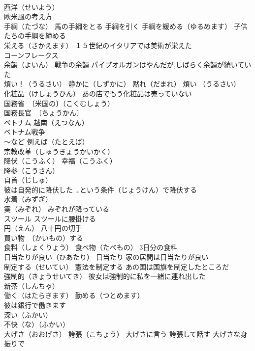 \documentclass[8pt]{extreport}
\begin{document}
\begin{CJK}{UTF8}{min}
\\	西洋（せいよう）
\\	欧米風の考え方
\\	手綱（たづな） 馬の手綱をとる 手綱を引く 手綱を緩める（ゆるめます） 子供たちの手綱を締める
\\	栄える（さかえます） １５世紀のイタリアでは美術が栄えた
\\	コーンフレークス
\\	余韻（よいん） 戦争の余韻 パイプオルガンはやんだが,しばらく余韻が続いていた
\\	煩い！（うるさい） 静かに（しずかに） 黙れ（だまれ） 煩い （うるさい）
\\	化粧品（けしょうひん） あの店でもう化粧品は売っていない
\\	国務省　〔米国の〕（こくむしょう） 
\\	国務長官　〔ちょうかん〕
\\	ベトナム 越南（えつなん）
\\	ベトナム戦争
\\	～など 例えば（たとえば）
\\	宗教改革（しゅうきょうかいかく）
\\	降伏（こうふく） 幸福（こうふく）
\\	降参（こうさん）
\\	自首（じしゅ）
\\	彼は自発的に降伏した …という条件（じょうけん）で降伏する
\\	水着（みずぎ）
\\	霙（みぞれ） みぞれが降っている
\\	スツール スツールに腰掛ける
\\	円（えん） 八十円の切手
\\	買い物　（かいもの）する
\\	食料（しょくりょう） 食べ物（たべもの） 3日分の食料
\\	日当たりが良い（ひあたり） 日当たり 家の居間は日当たりが良い
\\	制定する（せいてい） 憲法を制定する あの国は国旗を制定したところだ
\\	強制的（きょうせいてき） 彼女は強制的に私を一緒に連れ出した
\\	新茶（しんちゃ）
\\	働く（はたらきます） 勤める（つとめます）
\\	彼は銀行で働きます
\\	深い（ふかい） 
\\	不快（な）（ふかい）
\\	大げさ（おおげさ） 誇張（こちょう） 大げさに言う 誇張して話す 大げさな身振りで

\end{CJK}
\end{document}
